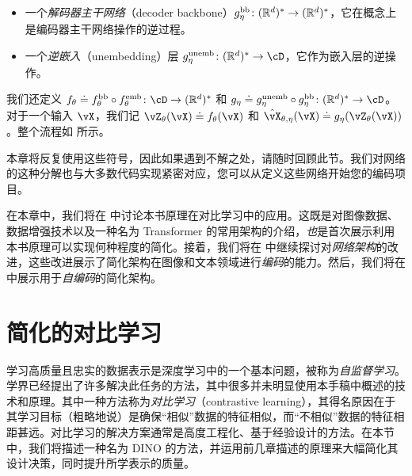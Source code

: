 \documentclass[../../book-main.tex]{subfiles}
\begin{document}
\begin{itemize}
\begin{itemize}
        \item 一个\textit{解码器主干网络}（decoder backbone）\(g_{\eta}^{\mathrm{bb}} \colon (\mathbb{R}^{d})^{*} \to (\mathbb{R}^{d})^{*}\)，它在概念上是编码器主干网络操作的逆过程。
        \item 一个\textit{逆嵌入}（unembedding）层 \(g_{\eta}^{\unemb} \colon (\R^{d})^{*} \to \cD\)，它作为嵌入层的逆操作。
    \end{itemize}
    我们还定义 \(f_{\theta} \doteq f_{\theta}^{\backbone} \circ f_{\theta}^{\emb} \colon \cD \to (\R^{d})^{*}\) 和 \(g_{\eta} \doteq g_{\eta}^{\unemb} \circ g_{\eta}^{\backbone} \colon (\R^{d})^{*} \to \cD\)。对于一个输入 \(\vX\)，我们记 \(\vZ_{\theta}(\vX) \doteq f_{\theta}(\vX)\) 和 \(\hat{\vX}_{\theta, \eta}(\vX) \doteq g_{\eta}(\vZ_{\theta}(\vX))\)。整个流程如  所示。
\end{itemize}

本章将反复使用这些符号，因此如果遇到不解之处，请随时回顾此节。我们对网络的这种分解也与大多数代码实现紧密对应，您可以从定义这些网络开始您的编码项目。

在本章中，我们将在  中讨论本书原理在对比学习中的应用。这既是对图像数据、数据增强技术以及一种名为 Transformer 的常用架构的介绍，\textit{也}是首次展示利用本书原理可以实现何种程度的简化。接着，我们将在  中继续探讨对\textit{网络架构}的改进，这些改进展示了简化架构在图像和文本领域进行\textit{编码}的能力。然后，我们将在  中展示用于\textit{自编码}的简化架构。%


\section{简化的对比学习}\label{sec:contrastive_learning}

学习高质量且忠实的数据表示是深度学习中的一个基本问题，被称为\textit{自监督学习}。学界已经提出了许多解决此任务的方法，其中很多并未明显使用本手稿中概述的技术和原理。其中一种方法称为\textit{对比学习}（contrastive learning），其得名原因在于其学习目标（粗略地说）是确保“相似”数据的特征相似，而“不相似”数据的特征相距甚远。对比学习的解决方案通常是高度工程化、基于经验设计的方法。在本节中，我们将描述一种名为 DINO \citep{caron2021emerging} 的方法，并运用前几章描述的原理来大幅简化其设计决策，同时提升所学表示的质量。
\end{document}
